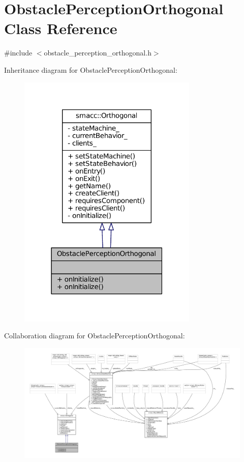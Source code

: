 \hypertarget{classObstaclePerceptionOrthogonal}{}\section{Obstacle\+Perception\+Orthogonal Class Reference}
\label{classObstaclePerceptionOrthogonal}


{\ttfamily \#include $<$obstacle\+\_\+perception\+\_\+orthogonal.\+h$>$}



Inheritance diagram for Obstacle\+Perception\+Orthogonal\+:
\nopagebreak
\begin{figure}[H]
\begin{center}
\leavevmode
\includegraphics[width=243pt]{classObstaclePerceptionOrthogonal__inherit__graph}
\end{center}
\end{figure}


Collaboration diagram for Obstacle\+Perception\+Orthogonal\+:
\nopagebreak
\begin{figure}[H]
\begin{center}
\leavevmode
\includegraphics[width=350pt]{classObstaclePerceptionOrthogonal__coll__graph}
\end{center}
\end{figure}

